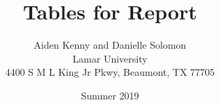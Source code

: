 \documentclass[11pt]{article}
\begin{document}

\title{Tables for Report}
\author{Aiden Kenny and Danielle Solomon\\
Lamar University\\
4400 S M L King Jr Pkwy, Beaumont, TX 77705}
\date{Summer 2019}
\maketitle


\lipsum[1-2]


\end{document}
